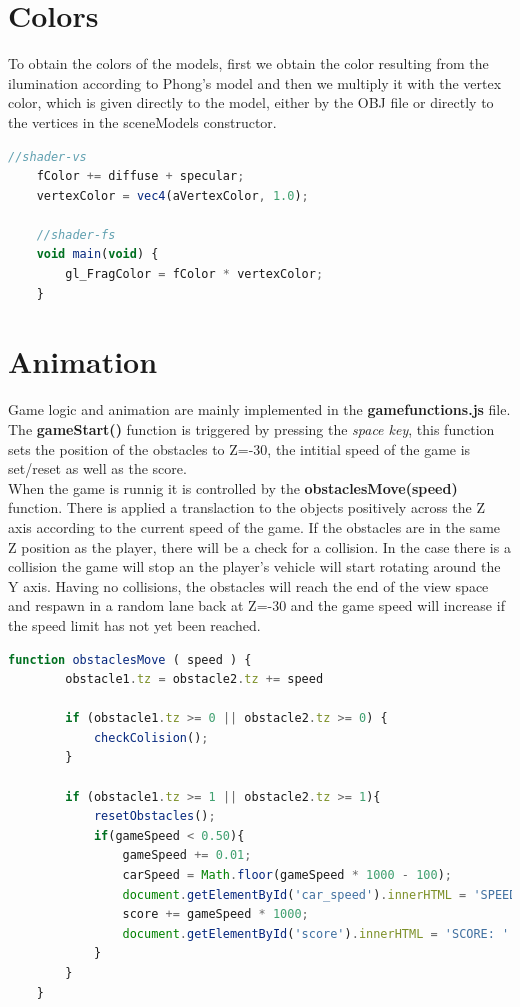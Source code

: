 \documentclass[english]{revdetua}
\begin{document}
\section{Colors}
To obtain the colors of the models, first we obtain the color resulting from the ilumination according to Phong's model and then we multiply it with the vertex color, which is given directly to the model, either by the OBJ file or directly to the vertices in the sceneModels constructor.

\begin{lstlisting}[language=JavaScript]
	//shader-vs
	fColor += diffuse + specular;	
	vertexColor = vec4(aVertexColor, 1.0);

	//shader-fs	
	void main(void) {
		gl_FragColor = fColor * vertexColor;
	}
\end{lstlisting}

\section{Animation}
Game logic and animation are mainly implemented in the \textbf{game\textunderscore functions.js} file. The \textbf{gameStart()} function is triggered by pressing the \textit{space key}, this function sets the position of the obstacles to Z=-30, the intitial speed of the game is set/reset as well as the score.
\\
When the game is runnig it is controlled by the \textbf{obstaclesMove(speed)} function. There is applied a translaction to the objects positively across the Z axis according to the current speed of the game. If the obstacles are in the same Z position as the player, there will be a check for a collision. In the case there is a collision the game will stop an the player's vehicle will start rotating around the Y axis. Having no collisions, the obstacles will reach the end of the view space and respawn in a random lane back at Z=-30 and the game speed will increase if the speed limit has not yet been reached.

\begin{lstlisting}[language=JavaScript]
	function obstaclesMove ( speed ) {
		obstacle1.tz = obstacle2.tz += speed

		if (obstacle1.tz >= 0 || obstacle2.tz >= 0) {
			checkColision();
		}

		if (obstacle1.tz >= 1 || obstacle2.tz >= 1){
			resetObstacles();
			if(gameSpeed < 0.50){
				gameSpeed += 0.01;
				carSpeed = Math.floor(gameSpeed * 1000 - 100);
				document.getElementById('car_speed').innerHTML = 'SPEED: ' + carSpeed + ' KPH';
				score += gameSpeed * 1000;
				document.getElementById('score').innerHTML = 'SCORE: ' + score;
			}
		}
	}
\end{lstlisting}
\end{document}
